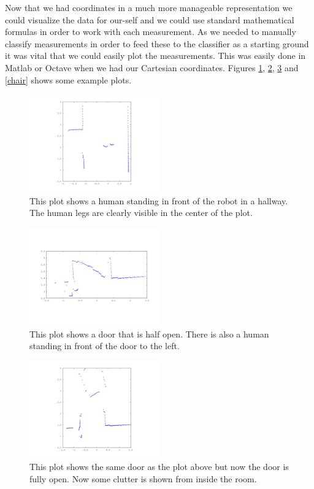 \documentclass[a4paper, 10pt, conference]{ieeeconf}      %
\begin{document}
Now that we had coordinates in a much more manageable representation we could visualize the data for our-self and we could use standard mathematical formulas in order to work with each measurement. As we needed to manually classify measurements in order to feed these to the classifier as a starting ground it was vital that we could easily plot the measurements. This was easily done in Matlab or Octave when we had our Cartesian coordinates. Figures \ref{human}, \ref{doorhalf}, \ref{doorfull} and \ref{chair} shows some example plots.


\begin{figure}
\centering
\includegraphics[width=0.5\textwidth]{presimg/human.jpg}
\caption{This plot shows a human standing in front of the robot in a hallway. The human legs are clearly visible in the center of the plot.}
\label{human}
\end{figure}

\begin{figure}
\centering
\includegraphics[width=0.5\textwidth]{presimg/doorhalf.jpg}
\caption{This plot shows a door that is half open. There is also a human standing in front of the door to the left.}
\label{doorhalf}
\end{figure}

\begin{figure}
\centering
\includegraphics[width=0.5\textwidth]{presimg/doorfull.jpg}
\caption{This plot shows the same door as the plot above but now the door is fully open. Now some clutter is shown from inside the room.}
\label{doorfull}
\end{figure}
\end{document}
